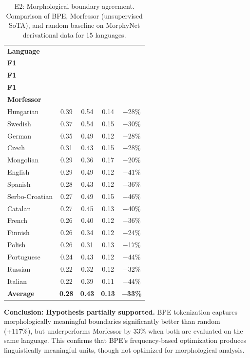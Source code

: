 \documentclass[11pt]{article}
\begin{document}
\begin{table}[ht]
\caption{E2: Morphological boundary agreement. Comparison of BPE, Morfessor (unsupervised SoTA), and random baseline on MorphyNet derivational data for 15 languages.}
\label{tab:e2_results}
\centering
\small
\begin{tabular}{lcccc}
\toprule
\textbf{Language} & \makecell[b]{\textbf{BPE} \\ \textbf{F1}} & \makecell[b]{\textbf{Morfessor} \\ \textbf{F1}} & \makecell[b]{\textbf{Random} \\ \textbf{F1}} & \makecell[b]{\textbf{BPE vs} \\ \textbf{Morfessor}} \\
\midrule
Hungarian & 0.39 & 0.54 & 0.14 & $-$28\% \\
Swedish & 0.37 & 0.54 & 0.15 & $-$30\% \\
German & 0.35 & 0.49 & 0.12 & $-$28\% \\
Czech & 0.31 & 0.43 & 0.15 & $-$28\% \\
Mongolian & 0.29 & 0.36 & 0.17 & $-$20\% \\
English & 0.29 & 0.49 & 0.12 & $-$41\% \\
Spanish & 0.28 & 0.43 & 0.12 & $-$36\% \\
Serbo-Croatian & 0.27 & 0.49 & 0.15 & $-$46\% \\
Catalan & 0.27 & 0.45 & 0.13 & $-$40\% \\
French & 0.26 & 0.40 & 0.12 & $-$36\% \\
Finnish & 0.26 & 0.34 & 0.12 & $-$24\% \\
Polish & 0.26 & 0.31 & 0.13 & $-$17\% \\
Portuguese & 0.24 & 0.43 & 0.12 & $-$44\% \\
Russian & 0.22 & 0.32 & 0.12 & $-$32\% \\
Italian & 0.22 & 0.39 & 0.11 & $-$44\% \\
\midrule
\textbf{Average} & \textbf{0.28} & \textbf{0.43} & \textbf{0.13} & \textbf{$-$33\%} \\
\bottomrule
\end{tabular}
\end{table}

\textbf{Conclusion:} \textbf{Hypothesis partially supported.} BPE tokenization captures morphologically meaningful boundaries significantly better than random (+117\%), but underperforms Morfessor by 33\% when both are evaluated on the same language. This confirms that BPE's frequency-based optimization produces linguistically meaningful units, though not optimized for morphological analysis.
\end{document}
